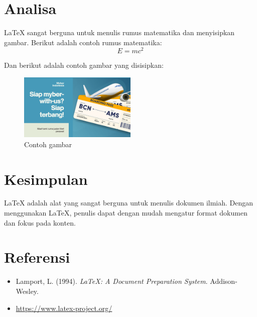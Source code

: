 \documentclass[a4paper,12pt]{report}
\begin{document}
\section{Analisa}

LaTeX sangat berguna untuk menulis rumus matematika dan menyisipkan gambar. Berikut adalah contoh rumus matematika:
\begin{equation}
E = mc^2
\end{equation}

Dan berikut adalah contoh gambar yang disisipkan:
\begin{figure}[h]
    \centering
    \includegraphics[width=0.5\textwidth]{../assets/banner.png}
    \caption{Contoh gambar}
    \label{fig:example}
\end{figure}



\section{Kesimpulan}
LaTeX adalah alat yang sangat berguna untuk menulis dokumen ilmiah. Dengan menggunakan LaTeX, penulis dapat dengan mudah mengatur format dokumen dan fokus pada konten.

\section*{Referensi}
\begin{itemize}
    \item Lamport, L. (1994). \textit{LaTeX: A Document Preparation System}. Addison-Wesley.
    \item \url{https://www.latex-project.org/}
\end{itemize}
\end{document}

